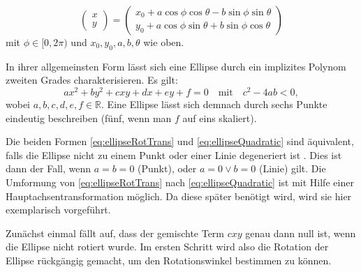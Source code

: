 \begin{equation} \label{eq:ellipseRotTransParam}
\begin{pmatrix}x \\ y\end{pmatrix} = \begin{pmatrix}x_0 + a\cos\phi\cos\theta - b\sin\phi\sin\theta \\
y_0 + a\cos\phi\sin\theta + b\sin\phi\cos\theta\end{pmatrix}
\end{equation}
mit $\phi \in [0, 2\pi)$ und $x_0, y_0, a,b, \theta$ wie oben.

In ihrer allgemeinsten Form lässt sich eine Ellipse durch ein implizites Polynom zweiten Grades charakterisieren. Es gilt:
\begin{equation} \label{eq:ellipseQuadratic}
ax^2 + by^2 + cxy + dx + ey + f = 0 \quad \text{mit}\quad c^2-4ab < 0,
\end{equation}
wobei $a,b,c,d,e,f \in \mathbb{R}$. Eine Ellipse lässt sich demnach durch sechs Punkte eindeutig beschreiben (fünf, wenn man $f$ auf eins skaliert).


Die beiden Formen \ref{eq:ellipseRotTrans} und \ref{eq:ellipseQuadratic} sind äquivalent, falls die Ellipse nicht zu einem Punkt oder einer Linie degeneriert ist \cite{Lawrence1972}. Dies ist dann der Fall, wenn $a = b = 0$ (Punkt), oder $a = 0 \lor b = 0$ (Linie) gilt. Die Umformung von \ref{eq:ellipseRotTrans} nach \ref{eq:ellipseQuadratic} ist mit Hilfe einer Hauptachsentransformation möglich.
Da diese später benötigt wird, wird sie hier exemplarisch vorgeführt.

Zunächst einmal fällt auf, dass der gemischte Term $cxy$ genau dann null ist, wenn die Ellipse nicht rotiert wurde. Im ersten Schritt wird also die Rotation der Ellipse rückgängig gemacht, um den Rotationswinkel bestimmen zu können.

